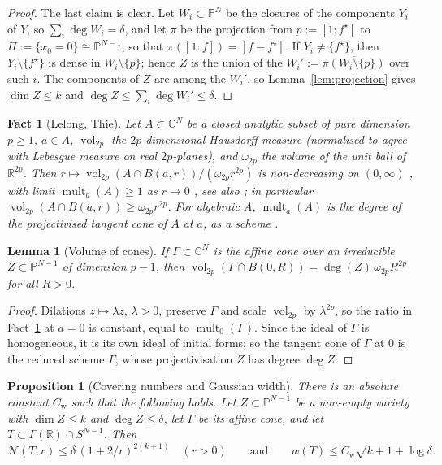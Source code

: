 \documentclass[11pt]{article}
\newtheorem{proposition}[theorem]{Proposition}
\newtheorem{lemma}[theorem]{Lemma}
\newtheorem{fact}[theorem]{Fact}
\newcommand{\R}{\mathbb{R}}
\newcommand{\C}{\mathbb{C}}
\newcommand{\PP}{\mathbb{P}}
\newcommand{\fs}{f^{\star}}
\newcommand{\cN}{\mathcal{N}}
\DeclareMathOperator{\vol}{vol}
\DeclareMathOperator{\mult}{mult}
\newcommand{\Cw}{C_{\mathrm{w}}}
\begin{document}
\begin{proof}
The last claim is clear. Let $W_i\subset\PP^N$ be the closures of the components $Y_i$ of $Y$, so $\sum_i\deg W_i=\delta$, and let $\pi$ be the projection from $p:=[1:\fs]$ to $\Pi:=\{x_0=0\}\cong\PP^{N-1}$, so that $\pi([1:f])=[f-\fs]$. If $Y_i\ne\{\fs\}$, then $Y_i\setminus\{\fs\}$ is dense in $W_i\setminus\{p\}$; hence $Z$ is the union of the $W_i':=\overline{\pi(W_i\setminus\{p\})}$ over such $i$. The components of $Z$ are among the $W_i'$, so Lemma~\ref{lem:projection} gives $\dim Z\le k$ and $\deg Z\le\sum_i\deg W_i'\le\delta$.
\end{proof}

\begin{fact}[Lelong, Thie]\label{fact:lelong}
Let $A\subset\C^N$ be a closed analytic subset of pure dimension $p\ge1$, $a\in A$, $\vol_{2p}$ the $2p$-dimensional Hausdorff measure (normalised to agree with Lebesgue measure on real $2p$-planes), and $\omega_{2p}$ the volume of the unit ball of $\R^{2p}$. Then $r\mapsto\vol_{2p}(A\cap B(a,r))/(\omega_{2p}r^{2p})$ is non-decreasing on $(0,\infty)$ \cite{Lelong}, with limit $\mult_a(A)\ge1$ as $r\to0$ \cite{Thie}, see also \cite{Chirka}; in particular $\vol_{2p}(A\cap B(a,r))\ge\omega_{2p}r^{2p}$. For algebraic $A$, $\mult_a(A)$ is the degree of the projectivised tangent cone of $A$ at $a$, as a scheme \cite[Lecture~20]{Harris}.
\end{fact}

\begin{lemma}[Volume of cones]\label{lem:conevol}
If $\Gamma\subset\C^N$ is the affine cone over an irreducible $Z\subset\PP^{N-1}$ of dimension $p-1$, then $\vol_{2p}(\Gamma\cap B(0,R))=\deg(Z)\,\omega_{2p}R^{2p}$ for all $R>0$.
\end{lemma}

\begin{proof}
Dilations $z\mapsto\lambda z$, $\lambda>0$, preserve $\Gamma$ and scale $\vol_{2p}$ by $\lambda^{2p}$, so the ratio in Fact~\ref{fact:lelong} at $a=0$ is constant, equal to $\mult_0(\Gamma)$. Since the ideal of $\Gamma$ is homogeneous, it is its own ideal of initial forms; so the tangent cone of $\Gamma$ at $0$ is the reduced scheme $\Gamma$, whose projectivisation $Z$ has degree $\deg Z$.
\end{proof}

\begin{proposition}[Covering numbers and Gaussian width]\label{prop:cover}
There is an absolute constant $\Cw$ such that the following holds. Let $Z\subset\PP^{N-1}$ be a non-empty variety with $\dim Z\le k$ and $\deg Z\le\delta$, let $\Gamma$ be its affine cone, and let $T\subset\Gamma(\R)\cap S^{N-1}$. Then
\[
\cN(T,r)\le\delta\,(1+2/r)^{2(k+1)}\quad(r>0)\qquad\text{and}\qquad w(T)\le\Cw\sqrt{k+1+\log\delta}.
\]
\end{proposition}
\end{document}
